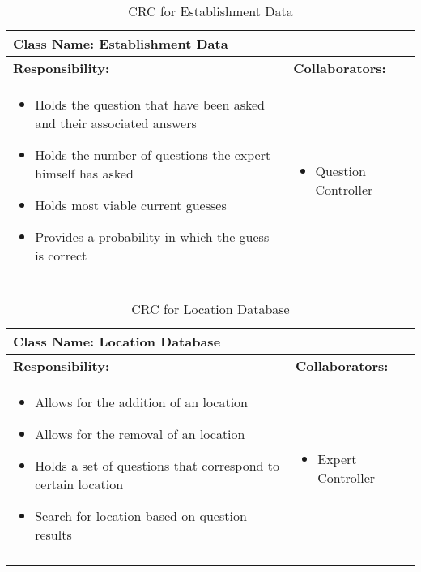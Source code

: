 \documentclass[titlepage]{article}
\begin{document}
\newpage
	\begin{longtable}{| p{} | p{} |}
			\hline
			 \multicolumn{2}{|l|}{\textbf{Class Name: Establishment Data}} \\
			\hline
			\textbf{Responsibility:} & \textbf{Collaborators:} \\
			\hline
				\begin{itemize}
					\item Holds the question that have been asked and their associated answers
					\item Holds the number of questions the expert himself has asked
					\item Holds most viable current guesses
					\item Provides a probability in which the guess is correct
				\end{itemize} & 
				\begin{itemize}
					\item Question Controller
				\end{itemize} 
				\\
			\hline
		\caption{CRC for Establishment Data}
	\end{longtable}
	
	\begin{longtable}{| p{} | p{} |}
			\hline
			 \multicolumn{2}{|l|}{\textbf{Class Name: Location Database}} \\
			\hline
			\textbf{Responsibility:} & \textbf{Collaborators:} \\
			\hline
				\begin{itemize}
					\item  Allows for the addition of an location
					\item Allows for the removal of an location
					\item Holds a set of questions that correspond to certain location
					\item Search for location based on question results
				\end{itemize} & 
				\begin{itemize}
					\item Expert Controller 
				\end{itemize} 
				\\
			\hline
		\caption{CRC for Location Database}
	\end{longtable}
	
\end{document}
